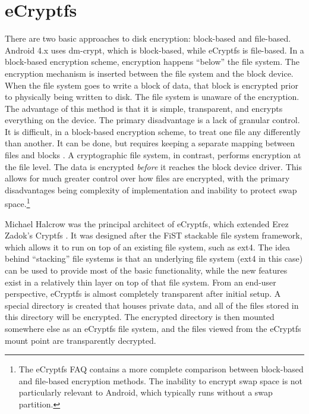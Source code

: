 \section{eCryptfs} 
\label{sec:ecryptfs}
There are two basic approaches to disk encryption: block-based and file-based. Android 4.x uses dm-crypt, which is
block-based, while eCryptfs is file-based.  In a block-based encryption scheme, encryption happens ``below'' the file system. The
encryption mechanism is inserted between the file system and the block device. When the file system goes to write a block of data,
that block is encrypted prior to physically being written to disk. The file system is unaware of the encryption. The advantage of
this method is that it is simple, transparent, and encrypts everything on the device. The primary disadvantage is a lack of granular
control. It is difficult, in a block-based encryption scheme, to treat one file any differently than another.  It can be done, but
requires keeping a separate mapping between files and blocks \cite{Dorrendorf2011}. A cryptographic file system, in contrast, performs encryption at the
file level. The data is encrypted \emph{before} it reaches the block device driver. This allows for much greater control over how
files are encrypted, with the primary disadvantages being complexity of implementation and inability to protect swap
space.\footnote{The eCryptfs FAQ contains a more complete comparison between block-based and file-based encryption methods. The
inability to encrypt swap space is not particularly relevant to Android, which typically runs without a swap partition.}

Michael Halcrow was the principal architect of eCryptfs, which extended Erez Zadok's Cryptfs \cite{Halcrow}. It was designed after
the FiST stackable file system framework, which allows it to run on top of an existing file system, such as ext4. The idea behind
``stacking'' file systems is that an underlying file system (ext4 in this case) can be used to provide most of the basic
functionality, while the new features exist in a relatively thin layer on top of that file system. From an end-user perspective,
eCryptfs is almost completely transparent after initial setup.  A special directory is created that houses private data, and all of
the files stored in this directory will be encrypted. The encrypted directory is then mounted somewhere else as an eCryptfs file
system, and the files viewed from the eCryptfs mount point are transparently decrypted. 

